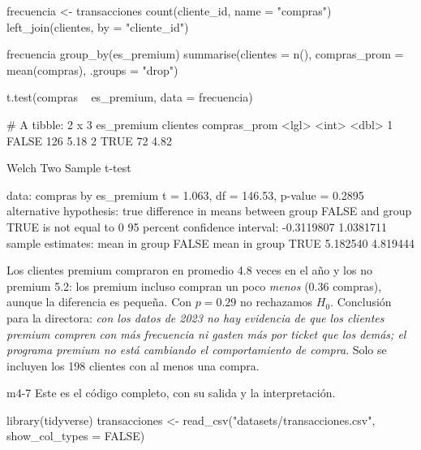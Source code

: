 \begin{rcode}
frecuencia <- transacciones %
  count(cliente_id, name = "compras") %
  left_join(clientes, by = "cliente_id")

frecuencia %
  group_by(es_premium) %
  summarise(clientes = n(), compras_prom = mean(compras),
            .groups = "drop")

t.test(compras ~ es_premium, data = frecuencia)
\end{rcode}
\begin{rsalida}
# A tibble: 2 x 3
  es_premium clientes compras_prom
  <lgl>         <int>        <dbl>
1 FALSE           126         5.18
2 TRUE             72         4.82

        Welch Two Sample t-test

data:  compras by es_premium
t = 1.063, df = 146.53, p-value = 0.2895
alternative hypothesis: true difference in means between group FALSE and group TRUE is not equal to 0
95 percent confidence interval:
 -0.3119807  1.0381711
sample estimates:
mean in group FALSE  mean in group TRUE
           5.182540            4.819444
\end{rsalida}

Los clientes premium compraron en promedio 4.8 veces en el año y los no
premium 5.2: los premium incluso compran un poco \emph{menos} (0.36 compras),
aunque la diferencia es pequeña. Con $p = 0.29$ no
rechazamos $H_0$. Conclusión para la directora: \emph{con los datos de 2023
no hay evidencia de que los clientes premium compren con más frecuencia ni
gasten más por ticket que los demás; el programa premium no está cambiando
el comportamiento de compra}. Solo se incluyen los 198 clientes con al menos
una compra.


\begin{solucion}{m4-7}
Este es el código completo, con su salida y la interpretación.
\end{solucion}

\begin{rcode}
library(tidyverse)
transacciones <- read_csv("datasets/transacciones.csv",
                          show_col_types = FALSE)
\end{rcode}

